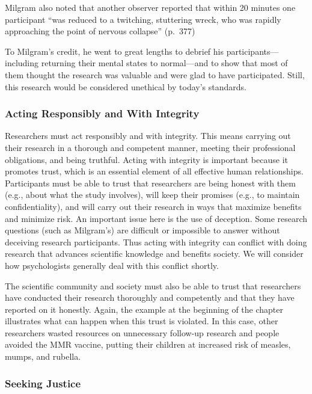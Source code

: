 \documentclass[
]{krantz}
\begin{document}
Milgram also noted that another observer reported that within 20 minutes one participant ``was reduced to a twitching, stuttering wreck, who was rapidly approaching the point of nervous collapse'' (p.~377)

To Milgram's credit, he went to great lengths to debrief his participants---including returning their mental states to normal---and to show that most of them thought the research was valuable and were glad to have participated. Still, this research would be considered unethical by today's standards.

\hypertarget{acting-responsibly-and-with-integrity}{%
\subsubsection*{Acting Responsibly and With Integrity}\label{acting-responsibly-and-with-integrity}}


Researchers must act responsibly and with integrity. This means carrying out their research in a thorough and competent manner, meeting their professional obligations, and being truthful. Acting with integrity is important because it promotes trust, which is an essential element of all effective human relationships. Participants must be able to trust that researchers are being honest with them (e.g., about what the study involves), will keep their promises (e.g., to maintain confidentiality), and will carry out their research in ways that maximize benefits and minimize risk. An important issue here is the use of deception. Some research questions (such as Milgram's) are difficult or impossible to answer without deceiving research participants. Thus acting with integrity can conflict with doing research that advances scientific knowledge and benefits society. We will consider how psychologists generally deal with this conflict shortly.

The scientific community and society must also be able to trust that researchers have conducted their research thoroughly and competently and that they have reported on it honestly. Again, the example at the beginning of the chapter illustrates what can happen when this trust is violated. In this case, other researchers wasted resources on unnecessary follow-up research and people avoided the MMR vaccine, putting their children at increased risk of measles, mumps, and rubella.

\hypertarget{seeking-justice}{%
\subsubsection*{Seeking Justice}\label{seeking-justice}}
\end{document}
